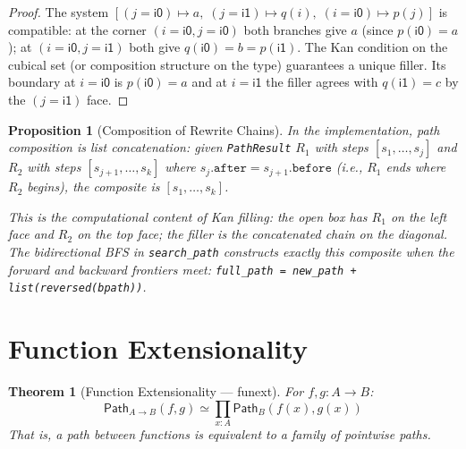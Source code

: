 \documentclass[11pt,a4paper]{report}
\theoremstyle{definition}
\theoremstyle{plain}
\newtheorem{theorem}[definition]{Theorem}
\newtheorem{proposition}[definition]{Proposition}
\newcommand{\Path}{\mathsf{Path}}
\begin{document}
\begin{proof}
The system $[(j = \mathsf{i0}) \mapsto a,\; (j = \mathsf{i1}) \mapsto
q(i),\; (i = \mathsf{i0}) \mapsto p(j)]$ is compatible: at the corner
$(i = \mathsf{i0}, j = \mathsf{i0})$ both branches give $a$
(since $p(\mathsf{i0}) = a$); at $(i = \mathsf{i0}, j = \mathsf{i1})$
both give $q(\mathsf{i0}) = b = p(\mathsf{i1})$.  The Kan condition
on the cubical set (or composition structure on the type) guarantees a
unique filler.  Its boundary at $i = \mathsf{i0}$ is $p(\mathsf{i0}) = a$
and at $i = \mathsf{i1}$ the filler agrees with $q(\mathsf{i1}) = c$
by the $(j = \mathsf{i1})$ face.
\end{proof}

\begin{proposition}[Composition of Rewrite Chains]
\label{prop:comp-rewrite}
In the implementation, path composition is list concatenation: given
\texttt{PathResult} $R_1$ with steps $[s_1, \ldots, s_j]$ and
$R_2$ with steps $[s_{j+1}, \ldots, s_k]$ where
$s_j.\texttt{after} = s_{j+1}.\texttt{before}$ (i.e., $R_1$ ends where
$R_2$ begins), the composite is $[s_1, \ldots, s_k]$.

This is the computational content of Kan filling: the open box has
$R_1$ on the left face and $R_2$ on the top face; the filler is the
concatenated chain on the diagonal.  The bidirectional BFS in
\texttt{search\_path} constructs exactly this composite when the
forward and backward frontiers meet:
\texttt{full\_path = new\_path + list(reversed(bpath))}.
\end{proposition}

\section{Function Extensionality}
\label{sec:funext}

\begin{theorem}[Function Extensionality --- funext]
\label{thm:funext}
For $f, g : A \to B$:
\[
  \Path_{A \to B}(f, g) \simeq \prod_{x : A} \Path_B(f(x), g(x))
\]
That is, a path between functions is equivalent to a family of
pointwise paths.
\end{theorem}
\end{document}
